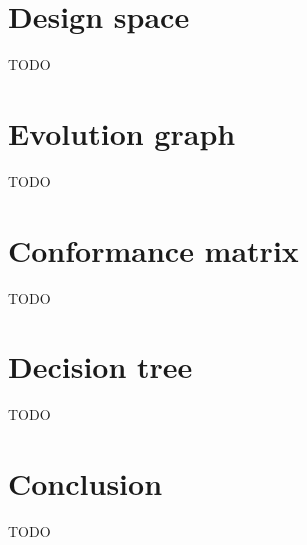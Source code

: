


\section{Design space}
\label{designs}

TODO

\section{Evolution graph}
\label{evolution}

TODO

\section{Conformance matrix}
\label{matrix}

TODO

\section{Decision tree}
\label{tree}

TODO

\section{Conclusion}
\label{conclusion}

TODO




\renewcommand{\addcontentsline}[3]{}%








